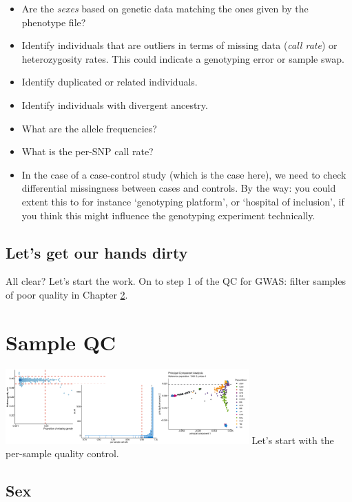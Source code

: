 \documentclass[
]{book}
\providecommand{\tightlist}{%
  \setlength{\itemsep}{0pt}\setlength{\parskip}{0pt}}
\begin{document}
\begin{itemize}
\tightlist
\item
  Are the \emph{sexes} based on genetic data matching the ones given by the phenotype file?
\item
  Identify individuals that are outliers in terms of missing data (\emph{call rate}) or heterozygosity rates. This could indicate a genotyping error or sample swap.
\item
  Identify duplicated or related individuals.
\item
  Identify individuals with divergent ancestry.
\item
  What are the allele frequencies?
\item
  What is the per-SNP call rate?
\item
  In the case of a case-control study (which is the case here), we need to check differential missingness between cases and controls. By the way: you could extent this to for instance `genotyping platform', or `hospital of inclusion', if you think this might influence the genotyping experiment technically.
\end{itemize}

\hypertarget{lets-get-our-hands-dirty}{%
\section{Let's get our hands dirty}\label{lets-get-our-hands-dirty}}

All clear? Let's start the work. On to step 1 of the QC for GWAS: filter samples of poor quality in Chapter \ref{gwas-basics-sample-qc}.

\hypertarget{gwas-basics-sample-qc}{%
\chapter{Sample QC}\label{gwas-basics-sample-qc}}

\includegraphics[width=0.7\textwidth,height=\textheight]{img/gwas_sample_qc.png}
Let's start with the per-sample quality control.

\hypertarget{sex}{%
\section{Sex}\label{sex}}
\end{document}
